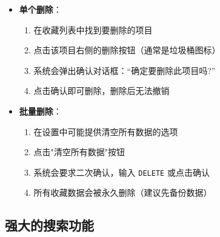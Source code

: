 \documentclass[10pt,a4paper]{article}
\newcommand{\subtitle}[1]{%
  \vspace{3pt}
  \noindent{\textbf{#1}}
}
\begin{document}
\subtitle{删除收藏}
\begin{itemize}
  \item \textbf{单个删除}：
    \begin{enumerate}
      \item 在收藏列表中找到要删除的项目
      \item 点击该项目右侧的删除按钮（通常是垃圾桶图标）
      \item 系统会弹出确认对话框：``确定要删除此项目吗?''
      \item 点击确认即可删除，删除后无法撤销
    \end{enumerate}
  \item \textbf{批量删除}：
    \begin{enumerate}
      \item 在设置中可能提供清空所有数据的选项
      \item 点击"清空所有数据"按钮
      \item 系统会要求二次确认，输入 \texttt{DELETE} 或点击确认
      \item 所有收藏数据会被永久删除（建议先备份数据）
    \end{enumerate}
\end{itemize}

\subsection{强大的搜索功能}
\end{document}
